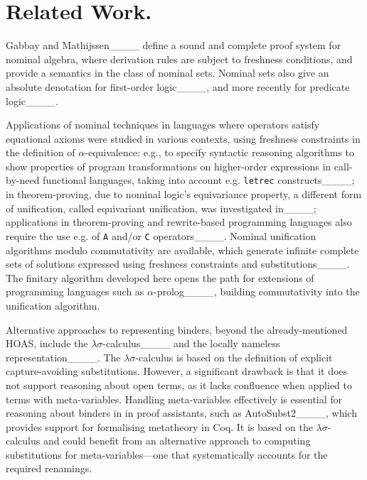 \section{Related Work.}
Gabbay and Mathijssen____ define a sound and complete proof system for nominal algebra, where derivation rules are subject to freshness conditions,
and provide a semantics in the class of nominal sets. %
Nominal sets also give an absolute denotation for first-order logic____, and more recently for predicate logic____.

 Applications of nominal techniques in languages where operators satisfy equational axioms were studied in various contexts, using freshness constraints in the definition of $\alpha$-equivalence: e.g., to specify syntactic reasoning algorithms to  show properties of program transformations on higher-order expressions in call-by-need functional languages, taking into account e.g. {\tt letrec} constructs____;  in theorem-proving, due to nominal logic’s equivariance property,  a different form of unification,  called equivariant unification, was investigated in____;
 applications in theorem-proving and rewrite-based programming languages also require the use e.g. of {\tt A} and/or {\tt C} operators____.  Nominal unification algorithms modulo commutativity are available, which generate infinite complete sets of solutions expressed using freshness constraints and substitutions____. 
The finitary  algorithm  developed here opens the path for  extensions of programming languages such as  $\alpha$-prolog____, building commutativity into the unification algorithm. 


Alternative approaches to representing binders, beyond the already-mentioned HOAS, include the $\lambda\sigma$-calculus____ and the locally nameless  representation____. The $\lambda\sigma$-calculus is based on the definition of  explicit capture-avoiding substitutions. However, a significant drawback is that it does not support reasoning about open terms, as it lacks confluence when applied to terms with meta-variables.
Handling meta-variables effectively is essential for reasoning about binders in  in proof assistants, such as AutoSubst2____, which provides support for formalising metatheory in Coq. It is based on the  $\lambda\sigma$-calculus and could benefit from an alternative approach to computing substitutions for meta-variables—one that systematically accounts for the required renamings.


